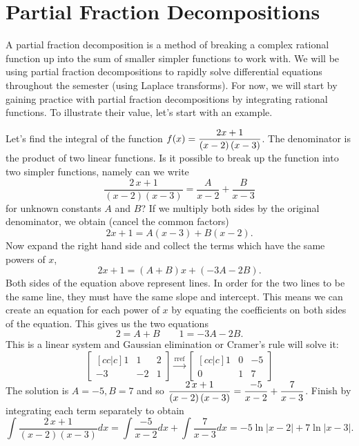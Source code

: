 \section{Partial Fraction Decompositions}
A partial fraction decomposition is a method of breaking a complex rational function up into the sum of smaller simpler functions to work with. We will be using partial fraction decompositions to rapidly solve differential equations throughout the semester (using Laplace transforms).  For now, we will start by gaining practice with partial fraction decompositions by integrating rational functions. To illustrate their value, let's start with an example.

\begin{example}
Let's find the integral of the function $\displaystyle f(x)= {\frac {2x+1}{ \left( x-2 \right)  \left( x-3 \right) }}$. The denominator is the product of two linear functions. Is it possible to break up the function into two simpler functions, namely can we write 
$${\frac {2\,x+1}{ \left( x-2 \right)  \left( x-3 \right) }}={\frac {A}{
x-2}}+{\frac {B}{x-3}}$$
for unknown constants $A$ and $B$? If we multiply both sides by the original denominator, we obtain (cancel the common factors)
$$2x+1 = A(x-3)+B(x-2).$$
Now expand the right hand side and collect the terms which have the same powers of $x$, 
$$2x+1 = (A+B)x+(-3A-2B).$$
Both sides of the equation above represent lines. In order for the two lines to be the same line, they must have the same slope and intercept.  This means we can create an equation for each power of $x$ by equating the coefficients on both sides of the equation.  This gives us the two equations
$$2=A+B \quad \quad 1=-3A-2B.$$
This is a linear system and Gaussian elimination or Cramer's rule will solve it:
$$
\begin{bmatrix}[cc|c]
1&1&2\\
-3&-2&1
\end{bmatrix}
\xrightarrow{\text{rref}}
\begin{bmatrix}[cc|c]
1&0&-5\\
0&1&7
\end{bmatrix}
$$
The solution is $A=-5,B=7$ and so $\displaystyle{\frac {2\,x+1}{ \left( x-2 \right)  \left( x-3 \right) }}={\frac {-5}{
x-2}}+{\frac {7}{x-3}}$. Finish by integrating each term separately to obtain 
$$\int{\frac {2\,x+1}{ \left( x-2 \right)  \left( x-3 \right) }}dx 
= \int {\frac {-5}{x-2}} dx +\int{\frac {7}{x-3}}dx
= {-5}\ln|{x-2}|+7\ln|{x-3}|.
$$
\end{example}

